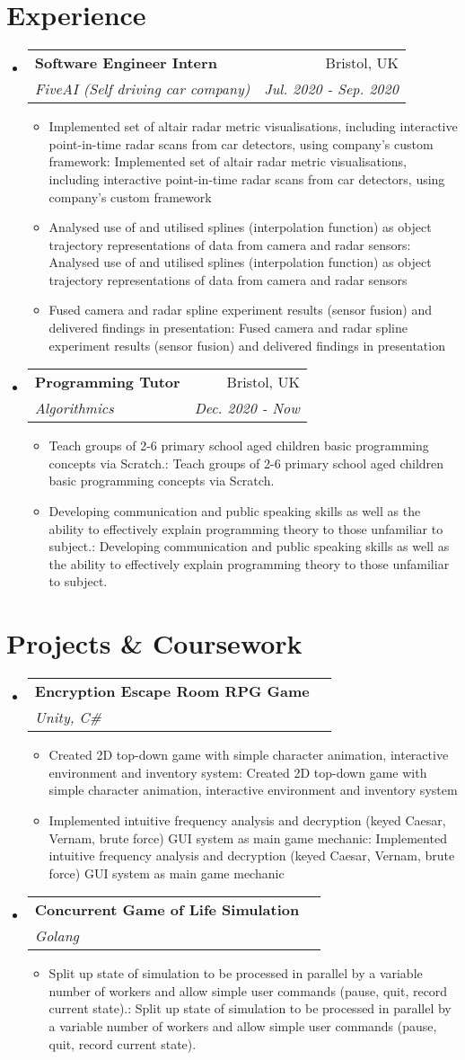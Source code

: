 \documentclass[a4paper,11pt]{article}
\makeatletter
\def \ifempty#1{\def\temp{#1} \ifx\temp\empty }
\newcommand{\resumeItem}[2]{
  \item\small{
  	\ifempty{#1}#2\else\textbf{#1}{: #2 \vspace{-2pt}}\fi
  }
}
\newcommand{\resumeSubheading}[4]{
  \vspace{-1pt}\item
    \begin{tabular*}{0.97\textwidth}{l@{\extracolsep{\fill}}r}
      \textbf{#1} & #2 \\
      \textit{\small#3} & \textit{\small #4} \\
    \end{tabular*}\vspace{-5pt}
}
\newcommand{\resumeSubHeadingListStart}{\begin{itemize}[leftmargin=*]}
\newcommand{\resumeSubHeadingListEnd}{\end{itemize}}
\newcommand{\resumeItemListStart}{\begin{itemize}}
\newcommand{\resumeItemListEnd}{\end{itemize}\vspace{-5pt}}
\makeatother
\begin{document}
\section{Experience}
  \resumeSubHeadingListStart
    \resumeSubheading
      {Software Engineer Intern}{Bristol, UK}
      {FiveAI (Self driving car company)}{Jul. 2020 - Sep. 2020}
      \resumeItemListStart
      	\resumeItem{}
          {Implemented set of altair radar metric visualisations, including interactive point-in-time radar scans from car detectors, using company's custom framework}
      	\resumeItem{}
          {Analysed use of and utilised splines (interpolation function) as object trajectory representations of data from camera and radar sensors}
        \resumeItem{}
          {Fused camera and radar spline experiment results (sensor fusion) and delivered findings in presentation}
        \resumeItemListEnd
      
    \resumeSubheading
      {Programming Tutor}{Bristol, UK}
      {Algorithmics}{Dec. 2020 - Now}
      \resumeItemListStart
      	\resumeItem{}
          {Teach groups of 2-6 primary school aged children basic programming concepts via Scratch.}
        \resumeItem{}
          {Developing communication and public speaking skills as well as the ability to effectively explain programming theory to those unfamiliar to subject.}
      \resumeItemListEnd
     
    
  \resumeSubHeadingListEnd


\section{Projects \& Coursework}
  \resumeSubHeadingListStart
    \resumeSubheading
      {Encryption Escape Room RPG Game}{}
      {Unity, C\#}{}
      \resumeItemListStart
        \resumeItem{}
          {Created 2D top-down game with simple character animation, interactive environment and inventory system}
        \resumeItem{}
          {Implemented intuitive frequency analysis and decryption (keyed Caesar, Vernam, brute force) GUI system as main game mechanic}
      \resumeItemListEnd
    \resumeSubheading
      {Concurrent Game of Life Simulation}{}
      {Golang}{}
      \resumeItemListStart
        \resumeItem{}
          {Split up state of simulation to be processed in parallel by a variable number of workers and allow simple user commands (pause, quit, record current state).}
      \resumeItemListEnd
  \resumeSubHeadingListEnd
\end{document}
